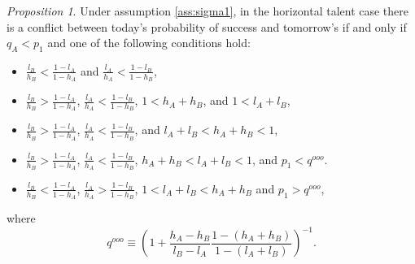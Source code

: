 \documentclass[12pt,american]{paper}
\theoremstyle{remark}
\newtheorem{prop}{Proposition}
\begin{document}
\begin{prop}\label{prop:nsc_learning_horizontal_appendix}
Under assumption \ref{ass:sigma1}, in the horizontal talent case there is a conflict between today's probability of success and tomorrow's if and only if $q_A<p_1$ and one of the following conditions hold:
\begin{itemize}
\item  $ \frac{l_B}{h_B}<\frac{1-l_A}{1-h_A} $ and $\frac{l_A}{h_A}<\frac{1-l_B}{1-h_B}$,
\item  $ \frac{l_B}{h_B}>\frac{1-l_A}{1-h_A} $, $\frac{l_A}{h_A}<\frac{1-l_B}{1-h_B}$,  $1<h_A+h_B$, and $1<l_A+l_B$,
\item  $ \frac{l_B}{h_B}>\frac{1-l_A}{1-h_A} $, $\frac{l_A}{h_A}<\frac{1-l_B}{1-h_B}$, and $l_A+l_B<h_A+h_B<1$,
\item  $ \frac{l_B}{h_B}>\frac{1-l_A}{1-h_A} $, $\frac{l_A}{h_A}<\frac{1-l_B}{1-h_B}$,  $h_A+h_B<l_A+l_B<1$, and $p_1<q^{ooo}$.
\item  $ \frac{l_B}{h_B}<\frac{1-l_A}{1-h_A} $, $\frac{l_A}{h_A}>\frac{1-l_B}{1-h_B}$, $1<l_A+l_B<h_A+h_B$ and $p_1 > q^{ooo}$,
\end{itemize} 
where
\[ 
q^{ooo}\equiv\left(1+\frac{h_A-h_B}{l_B-l_A}\frac{1-(h_A+h_B)}{1-(l_A+l_B)} \right)^{-1}.
\]
\end{prop}
%
\end{document}
